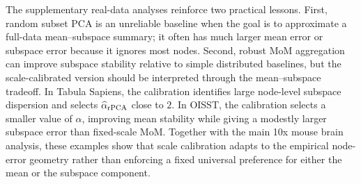 \documentclass[11pt]{article}
\begin{document}
The supplementary real-data analyses reinforce two practical lessons.  First, random subset PCA is an unreliable baseline when the goal is to approximate a full-data mean--subspace summary; it often has much larger mean error or subspace error because it ignores most nodes.  Second, robust MoM aggregation can improve subspace stability relative to simple distributed baselines, but the scale-calibrated version should be interpreted through the mean--subspace tradeoff.  In Tabula Sapiens, the calibration identifies large node-level subspace dispersion and selects \(\widehat\alpha_{\rm rPCA}\) close to \(2\).  In OISST, the calibration selects a smaller value of \(\alpha\), improving mean stability while giving a modestly larger subspace error than fixed-scale MoM.  Together with the main 10x mouse brain analysis, these examples show that scale calibration adapts to the empirical node-error geometry rather than enforcing a fixed universal preference for either the mean or the subspace component.
\end{document}
